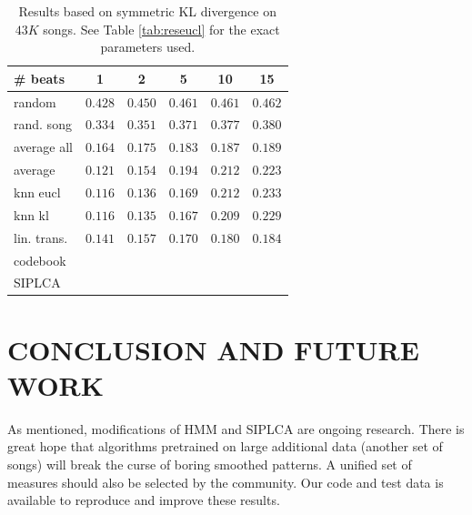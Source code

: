 \documentclass{article}
\begin{document}
\begin{table}[t]
\begin{small}
\begin{center}
\begin{tabular}{l|c|c|c|c|c|}
\# beats & 1 & 2 & 5 & 10 & 15 \\ \hline \hline
random & $0.428$ & $0.450$ & $0.461$ & $0.461$ & $0.462$  \\
rand. song & $0.334$ & $0.351$ & $0.371$ & $0.377$ & $0.380$  \\
average all & $0.164$ & $0.175$ & $0.183$ & $0.187$ & $0.189$ \\ 
average & $0.121$ & $0.154$ & $0.194$ & $0.212$ &  $0.223$ \\ \hline
knn eucl & $\mathbf{0.116}$ & $0.136$ & $0.169$ & $0.212$ & $0.233$ \\
knn kl & $\mathbf{0.116}$ & $\mathbf{0.135}$ & $\mathbf{0.167}$ & $0.209$ & $0.229$ \\
lin. trans. & $0.141$ & $0.157$ & $0.170$ & $\mathbf{0.180}$ & $\mathbf{0.184}$ \\
codebook & & & & &  \\
SIPLCA & & & & &  \\ \hline
\end{tabular}
\caption{Results based on symmetric KL divergence on $43K$ songs.
See Table \ref{tab:reseucl} for the exact parameters used.}
\label{tab:reskl}
\end{center}
\end{small}
\end{table}
\fi

\section{CONCLUSION AND FUTURE WORK}
\label{sec:conclusion}
As mentioned, modifications of HMM and SIPLCA are ongoing
research. There is great hope that algorithms pretrained
on large additional data (another set of songs) will break
the curse of boring smoothed patterns.
A unified set of measures should also be selected
by the community. Our code and test data is available to 
reproduce and improve these results.








\end{document}
